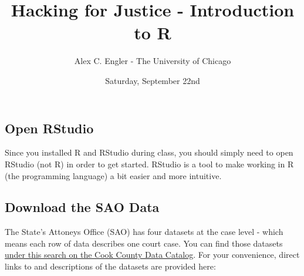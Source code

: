 \documentclass[]{article}
\title{Hacking for Justice - Introduction to R}
\author{Alex C. Engler - The University of Chicago}
\date{Saturday, September 22nd}
\begin{document}
\maketitle

\subsection{Open RStudio}\label{open-rstudio}

Since you installed R and RStudio during class, you should simply need
to open RStudio (not R) in order to get started. RStudio is a tool to
make working in R (the programming language) a bit easier and more
intuitive.

\subsection{Download the SAO Data}\label{download-the-sao-data}

The State's Attoneys Office (SAO) has four datasets at the case level -
which means each row of data describes one court case. You can find
those datasets
\href{https://datacatalog.cookcountyil.gov/browse?tags=state\%27s\%20attorney\%20case-level}{under
this search on the Cook County Data Catalog}. For your convenience,
direct links to and descriptions of the datasets are provided here:
\end{document}
